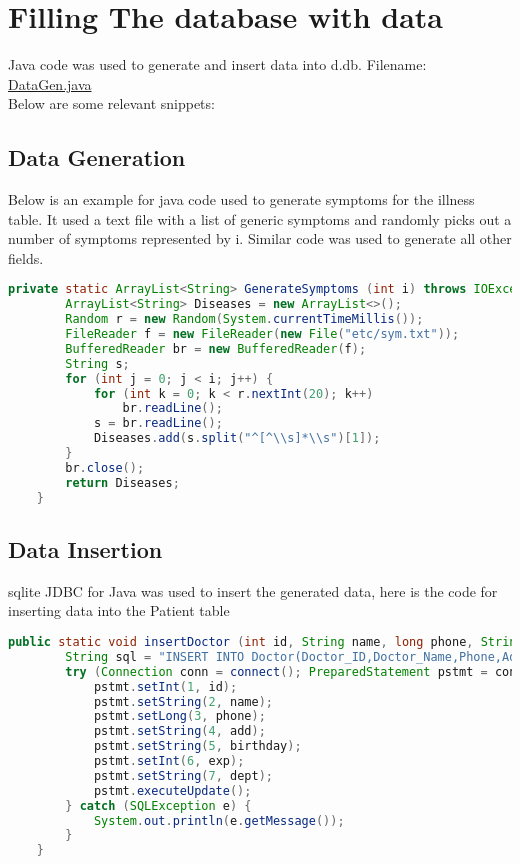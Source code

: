 \documentclass[12pt,arial]{article}
\begin{document}
\section{Filling The database with data}
Java code was used to generate and insert data into d.db. Filename: \url{DataGen.java} \\
Below are some relevant snippets:
\subsection{Data Generation}
Below is an example for java code used to generate symptoms for the illness table. It used a text file with a list of generic symptoms and randomly picks out a number of symptoms represented by i. Similar code was used to generate all other fields.
\begin{lstlisting}[language=java]
	private static ArrayList<String> GenerateSymptoms (int i) throws IOException {
        ArrayList<String> Diseases = new ArrayList<>();
        Random r = new Random(System.currentTimeMillis());
        FileReader f = new FileReader(new File("etc/sym.txt"));
        BufferedReader br = new BufferedReader(f);
        String s;
        for (int j = 0; j < i; j++) {
            for (int k = 0; k < r.nextInt(20); k++)
                br.readLine();
            s = br.readLine();
            Diseases.add(s.split("^[^\\s]*\\s")[1]);
        }
        br.close();
        return Diseases;
    }
\end{lstlisting}
\subsection{Data Insertion}
sqlite JDBC for Java was used to insert the generated data, here is the code for inserting data into the Patient table
\begin{lstlisting}[language=java]
	public static void insertDoctor (int id, String name, long phone, String add, String birthday, int exp, String dept) {
        String sql = "INSERT INTO Doctor(Doctor_ID,Doctor_Name,Phone,Address,Birthday,Experiences_Year,Department) VALUES(?,?,?,?,?,?,?)";
        try (Connection conn = connect(); PreparedStatement pstmt = conn.prepareStatement(sql)) {
            pstmt.setInt(1, id);
            pstmt.setString(2, name);
            pstmt.setLong(3, phone);
            pstmt.setString(4, add);
            pstmt.setString(5, birthday);
            pstmt.setInt(6, exp);
            pstmt.setString(7, dept);
            pstmt.executeUpdate();
        } catch (SQLException e) {
            System.out.println(e.getMessage());
        }
    }
\end{lstlisting}
\end{document}
